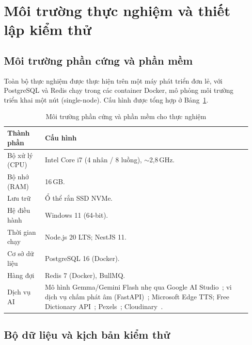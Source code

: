 \section{Môi trường thực nghiệm và thiết lập kiểm thử}
\label{sec:moi-truong}

\subsection{Môi trường phần cứng và phần mềm}
\label{subsec:moi-truong-phan-cung}

Toàn bộ thực nghiệm được thực hiện trên một máy phát triển đơn lẻ, với
PostgreSQL và Redis chạy trong các container Docker, mô phỏng môi trường
triển khai một nút (single-node). Cấu hình được tổng hợp ở
Bảng~\ref{tab:test-env}.

\begin{table}[h]
  \centering
  \small
  \renewcommand{\arraystretch}{1.3}
  \begin{tabular}{|p{4.0cm}|p{10.6cm}|}
    \hline
    \textbf{Thành phần} & \textbf{Cấu hình} \\
    \hline
    Bộ xử lý (CPU) & Intel Core i7 (4 nhân / 8 luồng), $\sim$2{,}8\,GHz. \\
    \hline
    Bộ nhớ (RAM) & 16\,GB. \\
    \hline
    Lưu trữ & Ổ thể rắn SSD NVMe. \\
    \hline
    Hệ điều hành & Windows 11 (64-bit). \\
    \hline
    Thời gian chạy & Node.js 20 LTS; NestJS 11. \\
    \hline
    Cơ sở dữ liệu & PostgreSQL 16 (Docker). \\
    \hline
    Hàng đợi & Redis 7 (Docker), BullMQ. \\
    \hline
    Dịch vụ AI & Mô hình Gemma/Gemini Flash nhẹ qua Google AI Studio~\cite{gemma2025technical}; vi dịch vụ chấm phát âm (FastAPI)~\cite{fastapi2024}; Microsoft Edge TTS; Free Dictionary API~\cite{freedictionaryapi}; Pexels~\cite{pexels2024}; Cloudinary~\cite{cloudinary2024}. \\
    \hline
  \end{tabular}
  \caption{Môi trường phần cứng và phần mềm cho thực nghiệm}
  \label{tab:test-env}
\end{table}

\subsection{Bộ dữ liệu và kịch bản kiểm thử}
\label{subsec:bo-du-lieu}

